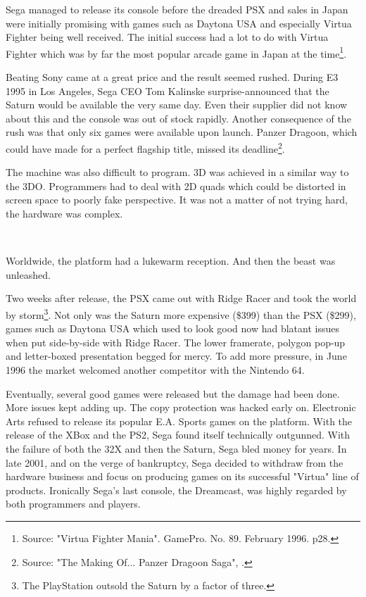 \vspace{-10pt}
Sega managed to release its console before the dreaded PSX and sales in Japan were initially promising with games such as Daytona USA and especially Virtua Fighter being well received. The initial success had a lot to do with Virtua Fighter which was by far the most popular arcade game in Japan at the time\footnote{Source: "Virtua Fighter Mania". GamePro. No. 89. February 1996.  p28.}.\\
\par
Beating Sony came at a great price and the result seemed rushed. During E3 1995 in Los Angeles, Sega CEO Tom Kalinske surprise-announced that the Saturn would be available the very same day. Even their supplier did not know about this and the console was out of stock rapidly. Another consequence of the rush was that only six games were available upon launch. Panzer Dragoon, which could have made for a perfect flagship title, missed its deadline\footnote{Source: "The Making Of... Panzer Dragoon Saga", .}.\\
\par The machine was also difficult to program. 3D was achieved in a similar way to the 3DO. Programmers had to deal with 2D quads which could be distorted in screen space to poorly fake perspective. It was not a matter of not trying hard, the hardware was complex.\\
\par
{}\\
\par
Worldwide, the platform had a lukewarm reception. And then the beast was unleashed.\\
\par
 Two weeks after release, the PSX came out with Ridge Racer and took the world by storm\footnote{The PlayStation outsold the Saturn by a factor of three.}. Not only was the Saturn more expensive (\$399) than the PSX (\$299), games such as Daytona USA which used to look good now had blatant issues when put side-by-side with Ridge Racer. The lower framerate, polygon pop-up and letter-boxed presentation begged for mercy. To add more pressure, in June 1996 the market welcomed another competitor with the Nintendo 64.\\
\par
Eventually, several good games were released but the damage had been done. More issues kept adding up. The copy protection was hacked early on. Electronic Arts refused to release its popular E.A. Sports games on the platform. With the release of the XBox and the PS2, Sega found itself technically outgunned. With the failure of both the 32X and then the Saturn, Sega bled money for years. In late 2001, and on the verge of bankruptcy, Sega decided to withdraw from the hardware business and focus on producing games on its successful "Virtua" line of products. Ironically Sega's last console, the Dreamcast, was highly regarded by both programmers and players.



